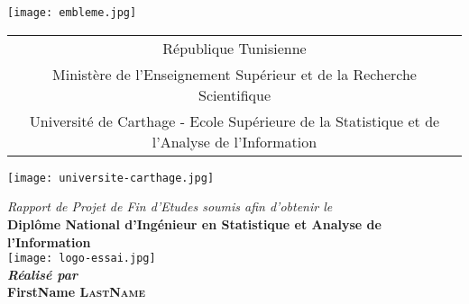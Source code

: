 \documentclass[a4paper, oneside, french, 12pt, final]{extreport}
\title{\reportSubject}
\author{\reportAuthor}
\newcommand{\reportTitle} {%
  \textsc{Projet de Fin d'\'etudes}
}
\newcommand{\reportAuthor} {%
  FirstName \textsc{LastName}%
}
\newcommand{\ESSAI} {%
  Ecole Sup\'erieure de la Statistique et de l'Analyse de l'Information
}
\begin{document}
\thispagestyle{empty}
\begin{titlepage}
\begin{center}



\texttt{[image: embleme.jpg]}
\vspace{0.5cm}

{%
  \fontsize{9pt}{9pt}\selectfont%
  \begin{tabular}{c}
    R\'epublique Tunisienne \\
    Minist\`ere de l'Enseignement Supérieur et de la Recherche Scientifique \\%
    Universit\'e de Carthage - \ESSAI{}\\ 
  \end{tabular}
}

\vspace{0.5cm}

\texttt{[image: universite-carthage.jpg]}



\vspace{5pt} {%
  \renewcommand*{\familydefault}{\defaultFont}
  \fontsize{46pt}{46pt}\selectfont%
}


\vspace{10pt}
{\textit{Rapport de Projet de Fin d'Etudes soumis afin d'obtenir le}}\\

\vspace{10pt}
{\textbf{\large Diplôme National d'Ingénieur en Statistique et Analyse de l'Information}}\\

\texttt{[image: logo-essai.jpg]}\\

\vspace{5pt}
\textbf{\textit{Réalisé par}}\\
\vspace{10pt} {%
  \fontsize{14pt}{14pt}\selectfont%
  {\bfseries\Large\sc \reportAuthor}\\
}%


\end{center}
\end{titlepage}
\end{document}
